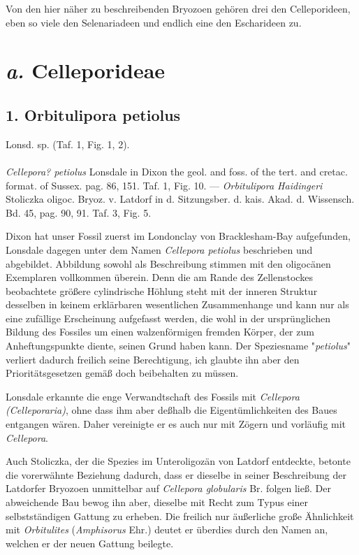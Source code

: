 \documentclass[a4paper, 11pt, oneside, german]{article}
\begin{document}
Von den hier näher zu beschreibenden Bryozoen gehören drei den Celleporideen, eben so viele den Selenariadeen und endlich eine den Escharideen zu.
\clearpage
\section{\emph{a.} Celleporideae}
\subsection{1. Orbitulipora petiolus}
\begin{center}
Lonsd. sp. (Taf. 1, Fig. 1, 2).
\end{center}
\paragraph{}
\emph{Cellepora? petiolus} Lonsdale in Dixon the geol. and foss. of the tert. and cretac. format. of Sussex. pag. 86, 151. Taf. 1, Fig. 10. --- \emph{Orbitulipora Haidingeri} Stoliczka oligoc. Bryoz. v. Latdorf in d. Sitzungsber. d. kais. Akad. d. Wissensch. Bd. 45, pag. 90, 91. Taf. 3, Fig. 5.

Dixon hat unser Fossil zuerst im Londonclay von Bracklesham-Bay aufgefunden, Lonsdale dagegen unter dem Namen \emph{Cellepora petiolus} beschrieben und abgebildet. Abbildung sowohl als Beschreibung stimmen mit den oligocänen Exemplaren vollkommen überein. Denn die am Rande des Zellenstockes beobachtete größere cylindrische Höhlung steht mit der inneren Struktur desselben in keinem erklärbaren wesentlichen Zusammenhange und kann nur als eine zufällige Erscheinung aufgefasst werden, die wohl in der ursprünglichen Bildung des Fossiles um einen walzenförmigen fremden Körper, der zum Anheftungspunkte diente, seinen Grund haben kann. Der Speziesname "\emph{petiolus}" verliert dadurch freilich seine Berechtigung, ich glaubte ihn aber den Prioritätsgesetzen gemäß doch beibehalten zu müssen.

Lonsdale erkannte die enge Verwandtschaft des Fossils mit \emph{Cellepora (Celleporaria)}, ohne dass ihm aber deßhalb die Eigentümlichkeiten des Baues entgangen wären. Daher vereinigte er es auch nur mit Zögern und vorläufig mit \emph{Cellepora}.

Auch Stoliczka, der die Spezies im Unteroligozän von Latdorf entdeckte, betonte die vorerwähnte Beziehung dadurch, dass er dieselbe in seiner Beschreibung der Latdorfer Bryozoen unmittelbar auf \emph{Cellepora globularis} Br. folgen ließ. Der abweichende Bau bewog ihn aber, dieselbe mit Recht zum Typus einer selbstständigen Gattung zu erheben. Die freilich nur äußerliche große Ähnlichkeit mit \emph{Orbitulites} (\emph{Amphisorus} Ehr.) deutet er überdies durch den Namen an, welchen er der neuen Gattung beilegte.
\end{document}
